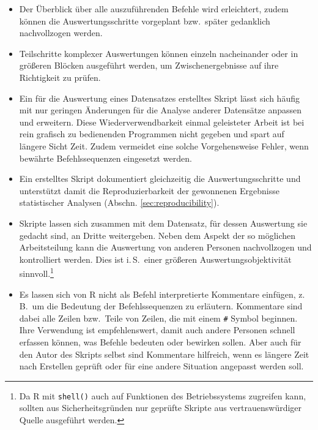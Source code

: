 \begin{itemize}
\item Der Überblick über alle auszuführenden Befehle wird erleichtert, zudem können die Auswertungsschritte vorgeplant bzw.\ später gedanklich nachvollzogen werden.
\item Teilschritte komplexer Auswertungen können einzeln nacheinander oder in größeren Blöcken ausgeführt werden, um Zwischenergebnisse auf ihre Richtigkeit zu prüfen.
\item Ein für die Auswertung eines Datensatzes erstelltes Skript lässt sich häufig mit nur geringen Änderungen für die Analyse anderer Datensätze anpassen und erweitern. Diese Wiederverwendbarkeit einmal geleisteter Arbeit ist bei rein grafisch zu bedienenden Programmen nicht gegeben und spart auf längere Sicht Zeit. Zudem vermeidet eine solche Vorgehensweise Fehler, wenn bewährte Befehlssequenzen eingesetzt werden.
\item Ein erstelltes Skript dokumentiert gleichzeitig die Auswertungsschritte und unterstützt damit die Reproduzierbarkeit der gewonnenen Ergebnisse statistischer Analysen (Abschn. \ref{sec:reproducibility}).
\item Skripte lassen sich zusammen mit dem Datensatz, für dessen Auswertung sie gedacht sind, an Dritte weitergeben. Neben dem Aspekt der so möglichen Arbeitsteilung kann die Auswertung von anderen Personen nachvollzogen und kontrolliert werden. Dies ist i.\,S.\ einer größeren Auswertungsobjektivität sinnvoll.\footnote{Da R mit \lstinline!shell()! auch auf Funktionen des Betriebssystems zugreifen kann, sollten aus Sicherheitsgründen nur geprüfte Skripte aus vertrauenswürdiger Quelle ausgeführt werden.}
\item Es lassen sich von R nicht als Befehl interpretierte Kommentare einfügen, z.\,B.\ um die Bedeutung der Befehlssequenzen zu erläutern. Kommentare sind dabei alle Zeilen bzw.\ Teile von Zeilen, die mit einem \lstinline!#! Symbol beginnen. Ihre Verwendung ist empfehlenswert, damit auch andere Personen schnell erfassen können, was Befehle bedeuten oder bewirken sollen. Aber auch für den Autor des Skripts selbst sind Kommentare hilfreich, wenn es längere Zeit nach Erstellen geprüft oder für eine andere Situation angepasst werden soll.
\end{itemize}

